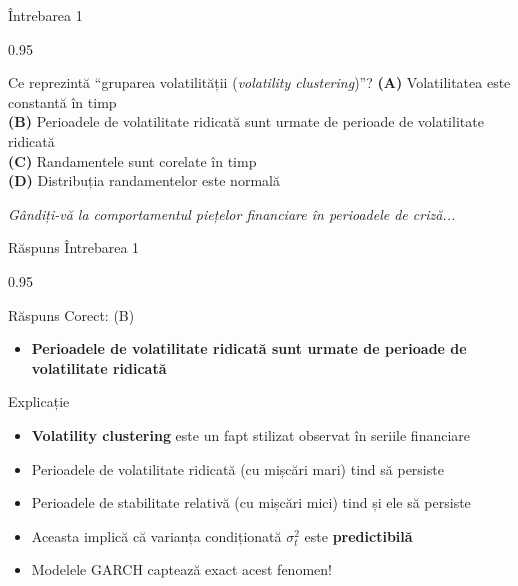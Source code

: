 \documentclass[9pt, aspectratio=169, t]{beamer}
\begin{document}
\begin{frame}{Întrebarea 1}
    \begin{cminipage}{0.95\textwidth}
    \begin{block}{Ce reprezintă ``gruparea volatilității (\emph{volatility clustering})''?}
        \textcolor{MainBlue}{\textbf{(A)}} Volatilitatea este constantă în timp\\[3pt]
        \textcolor{MainBlue}{\textbf{(B)}} Perioadele de volatilitate ridicată sunt urmate de perioade de volatilitate ridicată\\[3pt]
        \textcolor{MainBlue}{\textbf{(C)}} Randamentele sunt corelate în timp\\[3pt]
        \textcolor{MainBlue}{\textbf{(D)}} Distribuția randamentelor este normală
    \end{block}

    \vspace{0.5cm}

    \begin{center}
        \textit{Gândiți-vă la comportamentul piețelor financiare în perioadele de criză...}
    \end{center}
    \end{cminipage}
\end{frame}

\begin{frame}{Răspuns Întrebarea 1}
    \begin{cminipage}{0.95\textwidth}
    \begin{exampleblock}{Răspuns Corect: (B)}
        \begin{itemize}\setlength{\itemsep}{0pt}
            \item \textbf{Perioadele de volatilitate ridicată sunt urmate de perioade de volatilitate ridicată}
        \end{itemize}
    \end{exampleblock}

    \pause
    \begin{block}{Explicație}
        \begin{itemize}\setlength{\itemsep}{0pt}
            \item \textbf{Volatility clustering} este un fapt stilizat observat în seriile financiare
            \item Perioadele de volatilitate ridicată (cu mișcări mari) tind să persiste
            \item Perioadele de stabilitate relativă (cu mișcări mici) tind și ele să persiste
            \item Aceasta implică că varianța condiționată $\sigma_t^2$ este \textbf{predictibilă}
            \item Modelele GARCH captează exact acest fenomen!
        \end{itemize}
    \end{block}
    \end{cminipage}
\end{frame}
\end{document}
